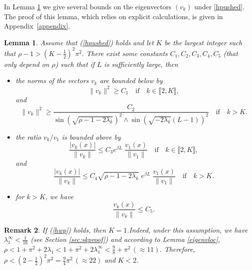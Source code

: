 \documentclass[11pt]{article}
\theoremstyle{plain}
\newtheorem{lemma}{Lemma}[section]
\newtheorem{rem}[lemma]{Remark}
\newcommand\linf{\lambda_1^\infty}
\begin{document}
In Lemma \ref{lem:est:evk} we give several bounds on the eigenvectors $(v_k)$  under \eqref{hpushed}. The proof of this lemma, which relies on explicit calculations, is given in Appendix~\ref{appendix}.
\begin{lemma}\label{lem:est:evk} Assume that (\ref{hpushed}) holds and let $K$ be the largest integer such that $
\rho-1>\left(K-\frac{1}{2}\right)^2\pi^2.$
There exist some constants $C_1,C_2,C_3,C_4,C_5$ (that only depend on $\rho$) such that if $L$ is sufficiently large, then 
\begin{itemize}
\item[(1)]the norms of the vectors $v_k$ are bounded below by\begin{equation*}
\|v_k\|^2\geqslant C_1 \quad  \text{if}\quad  k\in\llbracket2,K\rrbracket,
\end{equation*}
and
\begin{equation*}
\|v_k\|^2\geqslant \frac{C_2}{\sin(\sqrt{\rho-1-2\lambda_k})^2\wedge\sin(\sqrt{-2\lambda_k}(L-1))^2} \quad  \text{if}\quad k> K.
\end{equation*}
\item[(2)] the ratio $v_k/v_1$ is  bounded above by\begin{equation*}
\frac{|v_k(x)|}{\|v_k\|}\leqslant C_3 e^{\beta L}\;\frac{v_1(x)}{\|v_1\|} \quad  \text{if}\quad  k\in\llbracket2,K\rrbracket,
\end{equation*}
and
\begin{equation*}
\frac{|v_k(x)|}{\|v_k\|}\leqslant C_4 \sqrt{\rho-1-2\lambda_k}\;e^{\beta L}\;\frac{v_1(x)}{\|v_1\|}  \quad \text{if}\quad k> K.
\end{equation*}
\item[(3)] for $k>K$, we have 
\begin{equation*}
\frac{v_k(x)}{\|v_k\|}\leqslant C_5.
\end{equation*}
\end{itemize}
\end{lemma}

\begin{rem}
If (\ref{hwp}) holds, then $K=1$.\label{rm:K1} Indeed, under this assumption, we have  $\linf<\frac{1}{16}$ (see Section \ref{sec:skproof}) and according to Lemma \ref{eigenvloc}, 
$
\rho<1+\pi^2+2\lambda_1<1+\pi^2+2\linf<\frac{9}{8}+\pi^2 \,(\approx 11).
$
Therefore, $\rho< \left(2-\frac{1}{2}\right)^2\pi^2=\frac{9}{4}\pi^2\, (\approx 22)$ and $K<2$.
\end{rem}
\end{document}
